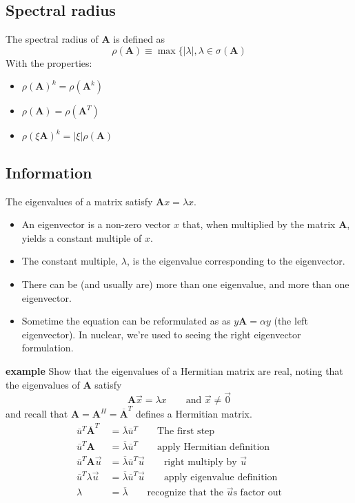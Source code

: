 \documentclass[12pt]{article}
\newcommand{\ve}[1]{\ensuremath{\mathbf{#1}}}
\newcommand{\cc}[1]{\ensuremath{\overline{#1}}}
\newcommand{\ccm}[1]{\ensuremath{\overline{\mathbf{#1}}}}
\begin{document}
\subsection{Spectral radius} 

The spectral radius of $\ve{A}$ is defined as 
\[\rho(\ve{A}) \equiv \max \lbrace |\lambda|, \lambda \in \sigma(\ve{A})\]
With the properties:
%
\begin{itemize}
\item $\rho(\ve{A})^k = \rho(\ve{A}^k)$
\item $\rho(\ve{A}) = \rho(\ve{A}^T)$
\item $\rho(\xi \ve{A})^k = |\xi| \rho(\ve{A})$
\end{itemize}

\subsection{Information}
The eigenvalues of a matrix satisfy $\ve{A}x = \lambda x$. 
%
\begin{itemize}
\item An eigenvector is a non-zero vector $x$ that, when multiplied by the matrix \ve{A}, yields a constant multiple of $x$. 
\item The constant multiple, $\lambda$, is the eigenvalue corresponding to the eigenvector.
\item There can be (and usually are) more than one eigenvalue, and more than one eigenvector. 
\item Sometime the equation can be reformulated as as $y\ve{A} = \alpha y$ (the left eigenvector). In nuclear, we're used to seeing the right eigenvector formulation.
\end{itemize}


\textbf{example}
Show that the eigenvalues of a Hermitian matrix are real, noting that the eigenvalues of $\ve{A}$ satisfy
\[\ve{A}\vec{x} = \lambda x \qquad \text{and } \vec{x} \neq \vec{0}\]
and recall that $\ve{A} = \ve{A}^H = \ccm{A}^T$ defines a Hermitian matrix.
%
\begin{align}
\cc{u}^T \ccm{A}^T &= \cc{\lambda} \cc{u}^T
\qquad \text{The first step} \nonumber \\
%
\cc{u}^T \ve{A} &= \cc{\lambda} \cc{u}^T 
\qquad \text{apply Hermitian definition}\nonumber \\
%
\cc{u}^T \ve{A} \vec{u} &= \cc{\lambda} \cc{u}^T \vec{u}
\qquad \text{right multiply by }\vec{u}\nonumber \\
%
\cc{u}^T \lambda \vec{u} &= \cc{\lambda} \cc{u}^T \vec{u}
\qquad \text{apply eigenvalue definition }\nonumber \\
%
\lambda &= \cc{\lambda} 
\qquad \text{recognize that the }\vec{u}\text{s factor out}\nonumber
\end{align}
 
\end{document}
